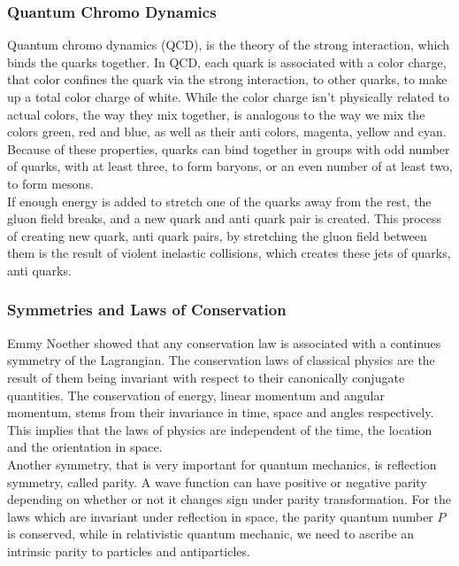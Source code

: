 \documentclass[11pt,a4paper]{article}
\begin{document}
\subsubsection{Quantum Chromo Dynamics}
Quantum chromo dynamics (QCD), is the theory of the strong interaction, which binds the quarks together. In QCD, each quark is associated with a color charge, that color confines the quark via the strong interaction, to other quarks, to make up a total color charge of white. While the color charge isn't physically related to actual colors, the way they mix together, is analogous to the way we mix the colors green, red and blue, as well as their anti colors, magenta, yellow and cyan. Because of these properties, quarks can bind together in groups with odd number of quarks, with at least three, to form baryons, or an even number of at least two, to form mesons.\\

If enough energy is added to stretch one of the quarks away from the rest, the gluon field breaks, and a new quark and anti quark pair is created. This process of creating new quark, anti quark pairs, by stretching the gluon field between them is the result of violent inelastic collisions, which creates these jets of quarks, anti quarks.

\subsubsection{Symmetries and Laws of Conservation} Emmy Noether showed that any
conservation law is associated with a continues symmetry of the Lagrangian. The
conservation laws of classical physics are the result of them being invariant
with respect to their canonically conjugate quantities. The conservation of
energy, linear momentum and angular momentum, stems from their invariance in
time, space and angles respectively. This implies that the laws of physics are
independent of the time, the location and the orientation in space.\\

Another symmetry, that is very important for quantum mechanics, is reflection
symmetry, called parity. A wave function can have positive or negative parity
depending on whether or not it changes sign under parity transformation. For the
laws which are invariant under reflection in space, the parity quantum number
$P$ is conserved, while in relativistic quantum mechanic, we need to ascribe an
intrinsic parity to particles and antiparticles.\\
\end{document}
